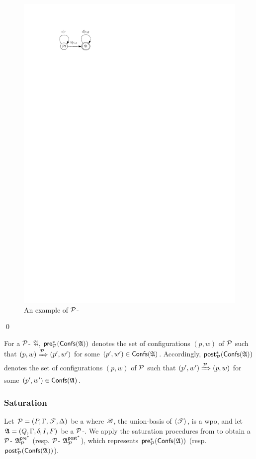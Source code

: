 \begin{example}
\begin{figure}[htb]
	\includegraphics[scale = 0.9]{pwpotrnfa-example.pdf}
	\caption{An example of ${\mathcal{P} }$-\WOTrNFA}\label{fig-ptrnfa-exmp}
\end{figure}
\qed
\end{example}

For a ${\mathcal{P} }$-{\WOTrNFA} ${\mathfrak{A} }$, ${\mathsf{pre} }^*_{\mathcal{P} }({\mathsf{Confs} }({\mathfrak{A} }))$  denotes the set of configurations $(p, w)$ of ${\mathcal{P} }$ such that $(p, w) \xRightarrow{{\mathcal{P} }} (p', w')$ for some $(p', w') \in {\mathsf{Confs} }({\mathfrak{A} })$. Accordingly, ${\mathsf{post} }^*_{\mathcal{P} }({\mathsf{Confs} }({\mathfrak{A} }))$ denotes the set of configurations $(p, w)$ of ${\mathcal{P} }$ such that $(p', w') \xRightarrow{{\mathcal{P} }} (p, w)$ for some $(p', w') \in {\mathsf{Confs} }({\mathfrak{A} })$.





\subsubsection{Saturation} \label{sect:decidability}
Let ${\mathcal{P} } = (P, \Gamma, {\mathscr{T} }, \Delta)$ be a  {\WOTrPDS} where ${\mathscr{B} }$, the union-basis of  $\langle {\mathscr{T} } \rangle$, is a wpo, and let ${\mathfrak{A} } = (Q, \Gamma, \delta, I, F)$ be a ${\mathcal{P} }$-{\WOTrNFA}. %
We apply the saturation procedures from \cite{SM+15,Song18} to obtain a ${\mathcal{P} }$-{\WOTrNFA} ${\mathfrak{A} }^{{\mathsf{pre} }^*}_{{\mathcal{P} }}$ (resp. ${\mathcal{P} }$-{\WOTrNFA} ${\mathfrak{A} }^{{\mathsf{post} }^*}_{{\mathcal{P} }}$), which represents ${\mathsf{pre} }^*_{\mathcal{P} }({\mathsf{Confs} }({\mathfrak{A} }))$ (resp. ${\mathsf{post} }^*_{\mathcal{P} }({\mathsf{Confs} }({\mathfrak{A} }))$).


